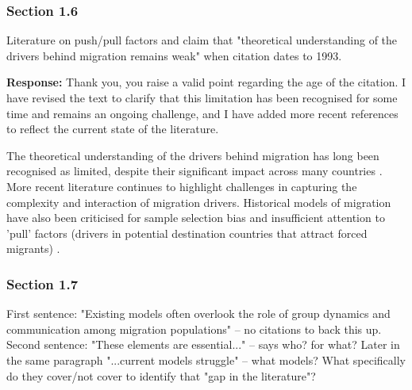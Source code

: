 \documentclass[11pt,a4paper]{article}
\begin{document}
\vspace{0.5cm}

\subsubsection*{Section 1.6}

\begin{reviewbox}
Literature on push/pull factors and claim that "theoretical understanding of the drivers behind migration remains weak" when citation dates to 1993.
\end{reviewbox}

\textbf{Response:}
Thank you, you raise a valid point regarding the age of the citation. I have revised the text to clarify that this limitation has been recognised for some time and remains an ongoing challenge, and I have added more recent references to reflect the current state of the literature.

\vspace{0.5cm}

\begin{updatebox}
The theoretical understanding of the drivers behind migration has long been recognised as limited, despite their significant impact across many countries \citep{227-massey1993theories}. More recent literature continues to highlight challenges in capturing the complexity and interaction of migration drivers. Historical models of migration have also been criticised for sample selection bias and insufficient attention to 'pull' factors (drivers in potential destination countries that attract forced migrants) \citep{145-davenport2003leave:}.
\end{updatebox}

\vspace{0.5cm}

\subsubsection*{Section 1.7}

\begin{reviewbox}
First sentence: "Existing models often overlook the role of group dynamics and communication among migration populations" -- no citations to back this up. Second sentence: "These elements are essential..." -- says who? for what? Later in the same paragraph "...current models struggle" -- what models? What specifically do they cover/not cover to identify that "gap in the literature"?
\end{reviewbox}
\end{document}

